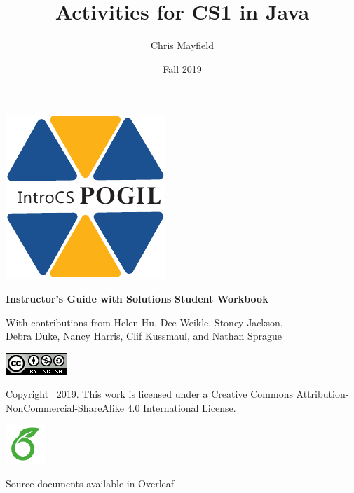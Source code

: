 \documentclass[12pt,twoside,openright]{report}
\title{Activities for CS1 in Java}
\author{Chris Mayfield}
\date{Fall 2019}
\begin{document}
\setcounter{page}{1}

\begin{titlepage}
\null\vfill
\centering

\includegraphics{../IntroCS.pdf}

\makeatletter

\vspace*{4em}
\huge \textbf{\@title}

\vspace*{2pt}
\ifdefined\Teacher
\color{DarkRed}
\Large \textbf{Instructor's Guide with Solutions}
\else
\color{ForestGreen}
\Large \textbf{Student Workbook}
\fi
\normalcolor

\vspace*{2em}
\large \@author

\vspace*{4pt}
\small With contributions from Helen Hu, Dee Weikle, Stoney Jackson, \\ Debra Duke, Nancy Harris, Clif Kussmaul, and Nathan Sprague

\vspace*{2em}
\Large \@date

\makeatother

\normalsize

\vspace*{4em}
\includegraphics{../by-nc-sa.png}

\vspace*{1ex}
Copyright \textcopyright\ 2019.
This work is licensed under a Creative Commons Attribution-NonCommercial-ShareAlike 4.0 International License.

\ifdefined\Teacher
\vspace*{2em}
\includegraphics[height=4em]{Overleaf.png}

\vspace*{1ex}
Source documents available in Overleaf
\fi

\vfill\null
\end{titlepage}
\end{document}
